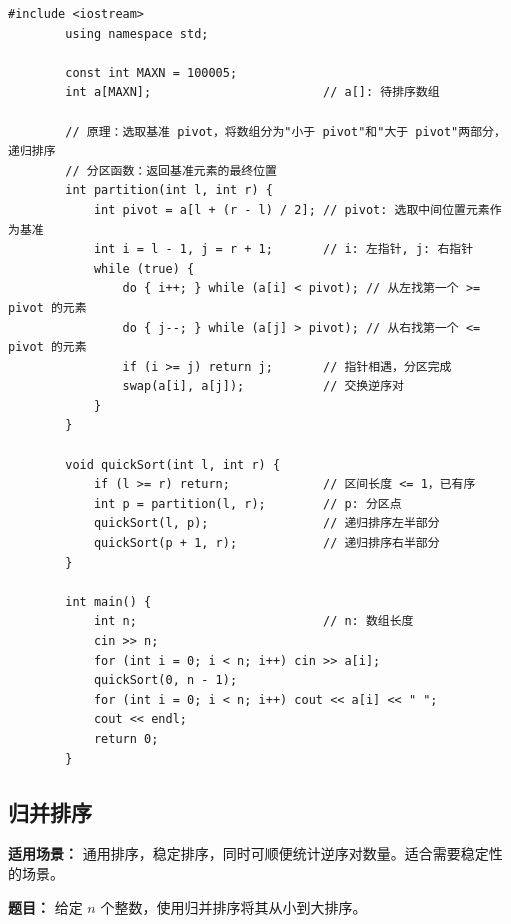 \documentclass[12pt,a4paper]{ctexart}
\begin{document}
	\begin{lstlisting}[caption={快速排序——分治 + 分区}]
		#include <iostream>
		using namespace std;
		
		const int MAXN = 100005;
		int a[MAXN];                        // a[]: 待排序数组
		
		// 原理：选取基准 pivot，将数组分为"小于 pivot"和"大于 pivot"两部分，递归排序
		// 分区函数：返回基准元素的最终位置
		int partition(int l, int r) {
			int pivot = a[l + (r - l) / 2]; // pivot: 选取中间位置元素作为基准
			int i = l - 1, j = r + 1;       // i: 左指针, j: 右指针
			while (true) {
				do { i++; } while (a[i] < pivot); // 从左找第一个 >= pivot 的元素
				do { j--; } while (a[j] > pivot); // 从右找第一个 <= pivot 的元素
				if (i >= j) return j;       // 指针相遇，分区完成
				swap(a[i], a[j]);           // 交换逆序对
			}
		}
		
		void quickSort(int l, int r) {
			if (l >= r) return;             // 区间长度 <= 1，已有序
			int p = partition(l, r);        // p: 分区点
			quickSort(l, p);                // 递归排序左半部分
			quickSort(p + 1, r);            // 递归排序右半部分
		}
		
		int main() {
			int n;                          // n: 数组长度
			cin >> n;
			for (int i = 0; i < n; i++) cin >> a[i];
			quickSort(0, n - 1);
			for (int i = 0; i < n; i++) cout << a[i] << " ";
			cout << endl;
			return 0;
		}
	\end{lstlisting}
	
	\subsection{归并排序}
	\textbf{适用场景：} 通用排序，稳定排序，同时可顺便统计逆序对数量。适合需要稳定性的场景。
	
	\textbf{题目：} 给定 $n$ 个整数，使用归并排序将其从小到大排序。
	
\end{document}

